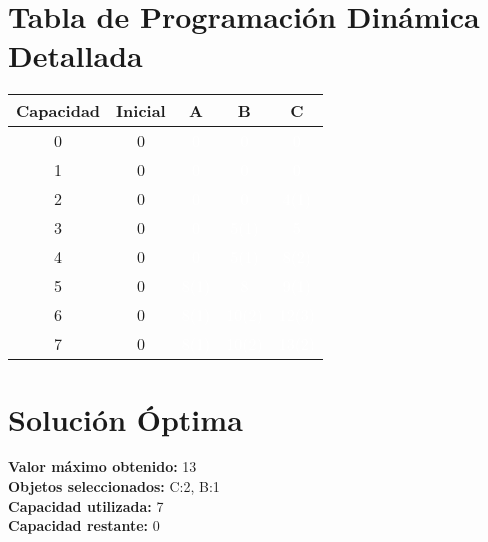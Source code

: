 \documentclass{article}
\begin{document}
\section*{Tabla de Programación Dinámica Detallada}
\begin{center}
\scriptsize
\begin{tabular}{|c|c|c|c|c|}
\hline
Capacidad & Inicial & A & B & C \\ \hline
0 & 0 & \cellcolor{rojo}\textcolor{white}{0} & \cellcolor{rojo}\textcolor{white}{0} & \cellcolor{rojo}\textcolor{white}{0} \\ \hline
1 & 0 & \cellcolor{rojo}\textcolor{white}{0} & \cellcolor{rojo}\textcolor{white}{0} & \cellcolor{rojo}\textcolor{white}{0} \\ \hline
2 & 0 & \cellcolor{rojo}\textcolor{white}{0} & \cellcolor{rojo}\textcolor{white}{0} & \cellcolor{verde}\textcolor{white}{4(1)} \\ \hline
3 & 0 & \cellcolor{rojo}\textcolor{white}{0} & \cellcolor{verde}\textcolor{white}{5(1)} & \cellcolor{rojo}\textcolor{white}{5} \\ \hline
4 & 0 & \cellcolor{rojo}\textcolor{white}{0} & \cellcolor{verde}\textcolor{white}{5(1)} & \cellcolor{verde}\textcolor{white}{8(2)} \\ \hline
5 & 0 & \cellcolor{verde}\textcolor{white}{8(1)} & \cellcolor{rojo}\textcolor{white}{8} & \cellcolor{verde}\textcolor{white}{9(1)} \\ \hline
6 & 0 & \cellcolor{verde}\textcolor{white}{8(1)} & \cellcolor{verde}\textcolor{white}{10(2)} & \cellcolor{verde}\textcolor{white}{12(3)} \\ \hline
7 & 0 & \cellcolor{verde}\textcolor{white}{8(1)} & \cellcolor{verde}\textcolor{white}{10(2)} & \cellcolor{verde}\textcolor{white}{13(2)} \\ \hline
\end{tabular}
\end{center}
\normalsize

\section*{Solución Óptima}
\textbf{Valor máximo obtenido:} 13\\
\textbf{Objetos seleccionados:} C:2, B:1\\
\textbf{Capacidad utilizada:} 7\\
\textbf{Capacidad restante:} 0\\
\end{document}
